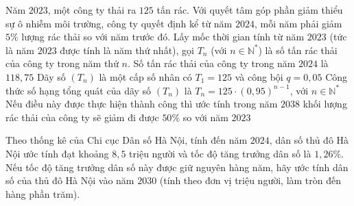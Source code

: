 \begin{ex}%
	Năm $2023$, một công ty thải ra $125$ tấn rác. Với quyết tâm góp phần giảm thiểu sự ô nhiễm môi trường, công ty quyết định kể từ năm $2024$, mỗi năm phải giảm $5\%$ lượng rác thải so với năm trước đó. Lấy mốc thời gian tính từ năm $2023$ (tức là năm $2023$ được tính là năm thứ nhất), gọi $T_n$ (với $n\in \mathbb{N}^*$) là số tấn rác thải của công ty trong năm thứ $n$.
	\choiceTF
	{\True Số tấn rác thải của công ty trong năm $2024$ là $118{,}75$}
	{Dãy số $(T_n)$ là một cấp số nhân có $T_1=125$ và công bội $q=0{,}05$}
	{\True Công thức số hạng tổng quát của dãy số $(T_n)$ là $T_n=125\cdot(0{,}95)^{n-1}$, với $n\in \mathbb{N}^*$}
	{Nếu điều này được thực hiện thành công thì ước tính trong năm $2038$ khối lượng rác thải của công ty sẽ giảm đi được $50\%$ so với năm $2023$}
\end{ex}

\begin{bt}%
	Theo thống kê của Chi cục Dân số Hà Nội, tính đến năm $2024$, dân số thủ đô Hà Nội ước tính đạt khoảng $8{,}5$ triệu người và tốc độ tăng trưởng dân số là $1{,}26\%$. Nếu tốc độ tăng trưởng dân số này được giữ nguyên hàng năm, hãy ước tính dân số của thủ đô Hà Nội vào năm $2030$ (tính theo đơn vị triệu người, làm tròn đến hàng phần trăm).
\end{bt}


